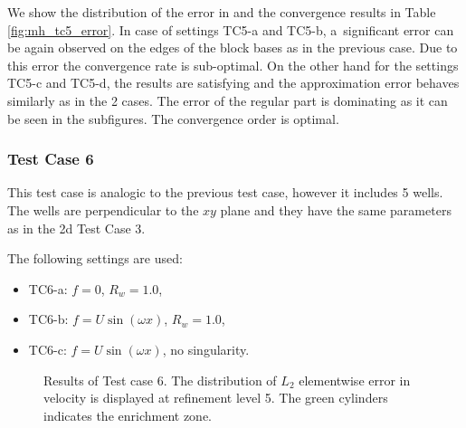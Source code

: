 We show the distribution of the error in  and the convergence results in Table \ref{fig:mh_tc5_error}.
In case of settings TC5-a and TC5-b, a~significant error can be again observed on the edges of the block bases as in the previous case.
Due to this error the convergence rate is sub-optimal.
On the other hand for the settings TC5-c and TC5-d, the results are satisfying and the approximation error behaves similarly
as in the 2 cases. The error of the regular part is dominating as it can be seen in the subfigures. The convergence order 
is optimal.

\subsubsection{Test Case 6}
This test case is analogic to the previous test case, however it includes 5 wells.
The wells are perpendicular to the $xy$ plane and they have the same parameters as in the 2d Test Case 3.

The following settings are used:
\begin{itemize}
    \item TC6-a: $f=0$, $R_w=1.0$,
    \item TC6-b: $f=U\sin(\omega x)$, $R_w=1.0$,
    \item TC6-c: $f=U\sin(\omega x)$, no singularity.
\end{itemize}
%
\begin{figure}[!htb]
    \centering
    \caption
    {Results of Test case 6. The distribution of $L_2$ elementwise error in velocity is displayed at refinement level 5.
    The green cylinders indicates the enrichment zone. }
    \label{fig:mh_tc6_error}
\end{figure}
%

